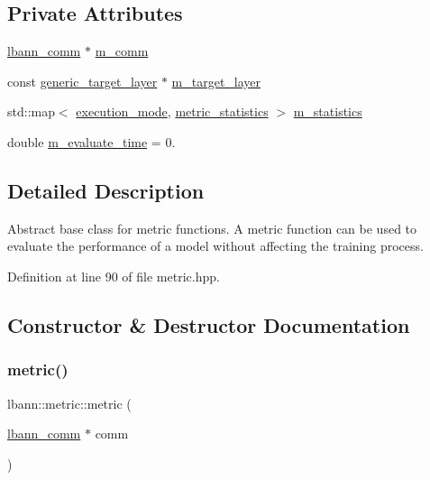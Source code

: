 \subsection*{Private Attributes}
\begin{DoxyCompactItemize}
\item 
\hyperlink{classlbann_1_1lbann__comm}{lbann\+\_\+comm} $\ast$ \hyperlink{classlbann_1_1metric_a547077709911e30c7d070545936c9c85}{m\+\_\+comm}
\item 
const \hyperlink{classlbann_1_1generic__target__layer}{generic\+\_\+target\+\_\+layer} $\ast$ \hyperlink{classlbann_1_1metric_a2bf6c53efb1b525bfa63a8c3167968d9}{m\+\_\+target\+\_\+layer}
\item 
std\+::map$<$ \hyperlink{base_8hpp_a2781a159088df64ed7d47cc91c4dc0a8}{execution\+\_\+mode}, \hyperlink{structlbann_1_1metric__statistics}{metric\+\_\+statistics} $>$ \hyperlink{classlbann_1_1metric_a9949d8aceedbc113aa2c356046ed73fc}{m\+\_\+statistics}
\item 
double \hyperlink{classlbann_1_1metric_a4c77a1bd1db77e9d837a72128e3d687f}{m\+\_\+evaluate\+\_\+time} = 0.
\end{DoxyCompactItemize}


\subsection{Detailed Description}
Abstract base class for metric functions. A metric function can be used to evaluate the performance of a model without affecting the training process. 

Definition at line 90 of file metric.\+hpp.



\subsection{Constructor \& Destructor Documentation}
\mbox{\label{classlbann_1_1metric_a3cd2d4f7dcbf94f70b3b8560a3171d9d}} 
\subsubsection{\texorpdfstring{metric()}{metric()}\hspace{0.1cm}{\footnotesize\ttfamily [1/2]}}
{\footnotesize\ttfamily lbann\+::metric\+::metric (\begin{DoxyParamCaption}\item[{\hyperlink{classlbann_1_1lbann__comm}{lbann\+\_\+comm} $\ast$}]{comm }\end{DoxyParamCaption})}

